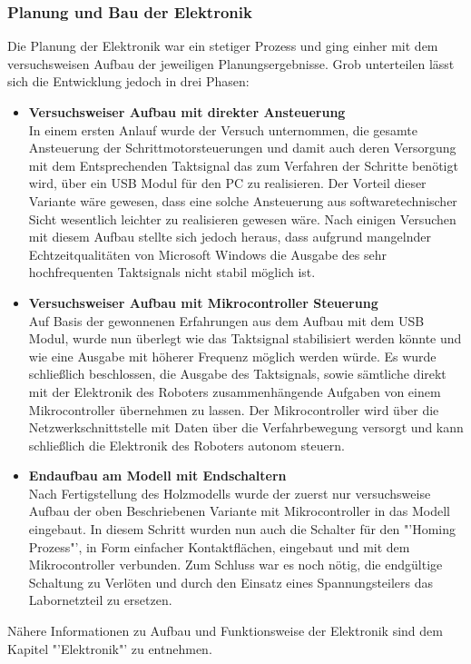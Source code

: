 \subsubsection{Planung und Bau der Elektronik}
Die Planung der Elektronik war ein stetiger Prozess und ging einher mit dem versuchsweisen Aufbau der jeweiligen Planungsergebnisse. Grob unterteilen lässt sich die Entwicklung jedoch in drei Phasen:
\begin{itemize}
\item \textbf{Versuchsweiser Aufbau mit direkter Ansteuerung}\\
In einem ersten Anlauf wurde der Versuch unternommen, die gesamte Ansteuerung der Schrittmotorsteuerungen und damit auch deren Versorgung mit dem Entsprechenden Taktsignal das zum Verfahren der Schritte benötigt wird, über ein USB Modul für den PC zu realisieren. Der Vorteil dieser Variante wäre gewesen, dass eine solche Ansteuerung aus softwaretechnischer Sicht wesentlich leichter zu realisieren gewesen wäre. Nach einigen Versuchen mit diesem Aufbau stellte sich jedoch heraus, dass aufgrund mangelnder Echtzeitqualitäten von Microsoft Windows die Ausgabe des sehr hochfrequenten Taktsignals nicht stabil möglich ist.
\item \textbf{Versuchsweiser Aufbau mit Mikrocontroller Steuerung}\\
Auf Basis der gewonnenen Erfahrungen aus dem Aufbau mit dem USB Modul, wurde nun überlegt wie das Taktsignal stabilisiert werden könnte und wie eine Ausgabe mit höherer Frequenz möglich werden würde. Es wurde schließlich beschlossen, die Ausgabe des Taktsignals, sowie sämtliche direkt mit der Elektronik des Roboters zusammenhängende Aufgaben von einem Mikrocontroller übernehmen zu lassen. Der Mikrocontroller wird über die Netzwerkschnittstelle mit Daten über die Verfahrbewegung versorgt und kann schließlich die Elektronik des Roboters autonom steuern.
\item \textbf{Endaufbau am Modell mit Endschaltern}\\
Nach Fertigstellung des Holzmodells wurde der zuerst nur versuchsweise Aufbau der oben Beschriebenen Variante mit Mikrocontroller in das Modell eingebaut. In diesem Schritt wurden nun auch die Schalter für den "'Homing Prozess"', in Form einfacher Kontaktflächen, eingebaut und mit dem Mikrocontroller verbunden.
Zum Schluss war es noch nötig, die endgültige Schaltung zu Verlöten und durch den Einsatz eines Spannungsteilers das Labornetzteil zu ersetzen.
\end{itemize}

Nähere Informationen zu Aufbau und Funktionsweise der Elektronik sind dem Kapitel "'Elektronik"' zu entnehmen.